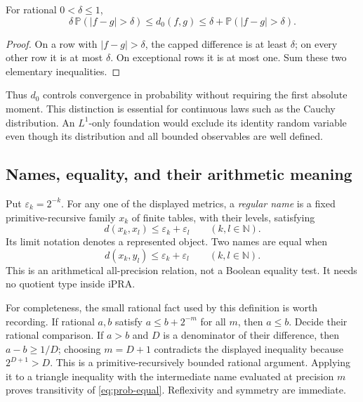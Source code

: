 \begin{lemma}
For rational $0<\delta\le1$,
\[
 \delta\,\mathbb P(|f-g|>\delta)
 \le d_0(f,g)
 \le \delta+\mathbb P(|f-g|>\delta).
\]
\end{lemma}
\begin{proof}
On a row with $|f-g|>\delta$, the capped difference is at least $\delta$;
on every other row it is at most $\delta$. On exceptional rows it is at most
one. Sum these two elementary inequalities.
\end{proof}

Thus $d_0$ controls convergence in probability without requiring the first
absolute moment. This distinction is essential for continuous laws such as
the Cauchy distribution. An $L^1$-only foundation would exclude its identity
random variable even though its distribution and all bounded observables are
well defined.

\subsection{Names, equality, and their arithmetic meaning}

Put $\varepsilon_k=2^{-k}$. For any one of the displayed metrics, a
\emph{regular name} is a fixed primitive-recursive family $x_k$ of finite
tables, with their levels, satisfying
\begin{equation}\label{eq:prob-regular}
 d(x_k,x_l)\le\varepsilon_k+\varepsilon_l\qquad(k,l\in\mathbb N).
\end{equation}
Its limit notation denotes a represented object. Two names are equal when
\begin{equation}\label{eq:prob-equal}
 d(x_k,y_l)\le\varepsilon_k+\varepsilon_l\qquad(k,l\in\mathbb N).
\end{equation}
This is an arithmetical all-precision relation, not a Boolean equality test.
It needs no quotient type inside iPRA.

For completeness, the small rational fact used by this definition is worth
recording. If rational $a,b$ satisfy $a\le b+2^{-m}$ for all $m$, then $a\le b$.
Decide their rational comparison. If $a>b$ and $D$ is a denominator of their
difference, then $a-b\ge1/D$; choosing $m=D+1$ contradicts the displayed
inequality because $2^{D+1}>D$. This is a primitive-recursively bounded
rational argument. Applying it to a triangle inequality with the intermediate
name evaluated at precision $m$ proves transitivity of
\eqref{eq:prob-equal}. Reflexivity and symmetry are immediate.

